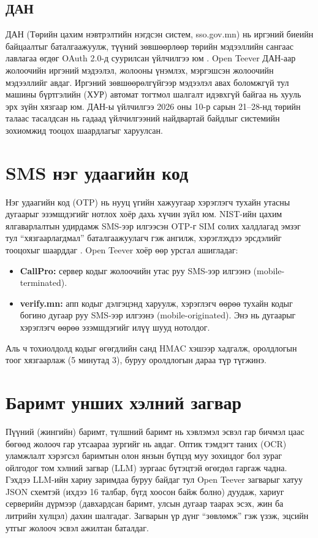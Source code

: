 \documentclass[
12pt,
oneside,
english,
onehalfspacing,
nolistspacing,
headsepline,
]{MUST-Thesis}
\begin{document}
\subsection{ДАН}

ДАН (Төрийн цахим нэвтрэлтийн нэгдсэн систем, sso.gov.mn) нь иргэний биеийн байцаалтыг баталгаажуулж, түүний зөвшөөрлөөр төрийн мэдээллийн сангаас лавлагаа өгдөг OAuth 2.0-д суурилсан үйлчилгээ юм \cite{dansso}. Open Teever ДАН-аар жолоочийн иргэний мэдээлэл, жолооны үнэмлэх, мэргэшсэн жолоочийн мэдээллийг авдаг. Иргэний зөвшөөрөлгүйгээр мэдээлэл авах боломжгүй тул машины бүртгэлийн (ХУР) автомат тогтмол шалгалт идэвхгүй байгаа нь хууль эрх зүйн хязгаар юм. ДАН-ы үйлчилгээ 2026 оны 10-р сарын 21--28-нд төрийн талаас тасалдсан нь гадаад үйлчилгээний найдвартай байдлыг системийн зохиомжид тооцох шаардлагыг харуулсан.

\section{SMS нэг удаагийн код}

Нэг удаагийн код (OTP) нь нууц үгийн хажуугаар хэрэглэгч тухайн утасны дугаарыг эзэмшдэгийг нотлох хоёр дахь хүчин зүйл юм. NIST-ийн цахим ялгаварлалтын удирдамж SMS-ээр илгээсэн OTP-г SIM солих халдлагад эмзэг тул ``хязгаарлагдмал'' баталгаажуулагч гэж ангилж, хэрэглэхдээ эрсдэлийг тооцохыг шаарддаг \cite{nist80063}. Open Teever хоёр өөр урсгал ашигладаг:
\begin{itemize}
    \item \textbf{CallPro:} сервер кодыг жолоочийн утас руу SMS-ээр илгээнэ (mobile-terminated).
    \item \textbf{verify.mn:} апп кодыг дэлгэцэнд харуулж, хэрэглэгч өөрөө тухайн кодыг богино дугаар руу SMS-ээр илгээнэ (mobile-originated). Энэ нь дугаарыг хэрэглэгч өөрөө эзэмшдэгийг илүү шууд нотолдог.
\end{itemize}
Аль ч тохиолдолд кодыг өгөгдлийн санд HMAC хэшээр хадгалж, оролдлогын тоог хязгаарлаж (5 минутад 3), буруу оролдлогын дараа түр түгжинэ.

\section{Баримт унших хэлний загвар}

Пүүний (жингийн) баримт, түлшний баримт нь хэвлэмэл эсвэл гар бичмэл цаас бөгөөд жолооч гар утсаараа зургийг нь авдаг. Оптик тэмдэгт таних (OCR) уламжлалт хэрэгсэл баримтын олон янзын бүтцэд муу зохицдог бол зураг ойлгодог том хэлний загвар (LLM) зургаас бүтэцтэй өгөгдөл гаргаж чадна. Гэхдээ LLM-ийн хариу заримдаа буруу байдаг тул Open Teever загварыг хатуу JSON схемтэй (ихдээ 16 талбар, бүгд хоосон байж болно) дуудаж, хариуг серверийн дүрмээр (давхардсан баримт, улсын дугаар таарах эсэх, жин ба литрийн хүлцэл) дахин шалгадаг. Загварын үр дүнг ``зөвлөмж'' гэж үзэж, эцсийн утгыг жолооч эсвэл ажилтан баталдаг.
\end{document}
